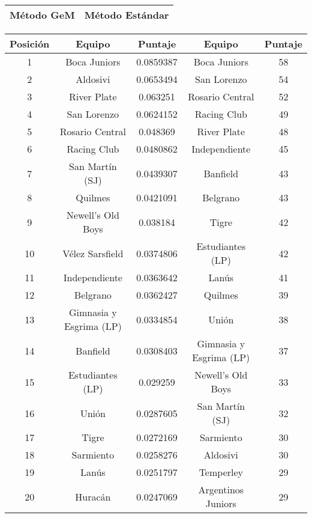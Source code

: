 \begin{table}[H]
	\center
	\begin{flushright}
	\begin{tabular}{| m{} || m{} |}
		\rowcolor{LightCyan}
		\hline Método GeM & Método Estándar \\ \hline
	\end{tabular}

	\begin{tabular}{| c | c | c || c | c |}
	  	\hline
	  	\rowcolor{LightCyan}
	  	Posición & Equipo & Puntaje & Equipo & Puntaje \\ \hline \hline
		1 & Boca Juniors & 0.0859387 & Boca Juniors & 58 \\ \hline
		2 & \cellcolor{Gray} Aldosivi & 0.0653494 & San Lorenzo & 54 \\ \hline
		3 & River Plate & 0.063251  & Rosario Central & 52\\ \hline
		4 & San Lorenzo & 0.0624152 & Racing Club & 49\\ \hline
		5 & Rosario Central & 0.048369 & River Plate & 48\\ \hline
		6 & Racing Club & 0.0480862 & Independiente & 45\\ \hline
		7 & San Martín (SJ) & 0.0439307 & Banfield & 43\\ \hline
		8 & Quilmes & 0.0421091 & Belgrano & 43\\ \hline
		9 & Newell's Old Boys & 0.038184 & Tigre & 42\\ \hline
		10 & Vélez Sarsfield & 0.0374806 & Estudiantes (LP) & 42\\ \hline
		11 & Independiente & 0.0363642 & Lanús & 41\\ \hline
		12 & Belgrano & 0.0362427 & Quilmes & 39\\ \hline
		13 & Gimnasia y Esgrima (LP) & 0.0334854 & Unión & 38\\ \hline
		14 & Banfield & 0.0308403 & Gimnasia y Esgrima (LP) & 37\\ \hline
		15 & Estudiantes (LP) & 0.029259 & Newell's Old Boys & 33\\ \hline
		16 & Unión & 0.0287605 & San Martín (SJ) & 32\\ \hline
		17 & Tigre & 0.0272169 & Sarmiento & 30\\ \hline
		18 & Sarmiento & 0.0258276 & \cellcolor{Gray} Aldosivi & 30\\ \hline
		19 & Lanús & 0.0251797 & Temperley & 29\\ \hline
		20 & Huracán & 0.0247069 & Argentinos Juniors & 29\\ \hline

\end{tabular}
\end{flushright}
\end{table}
